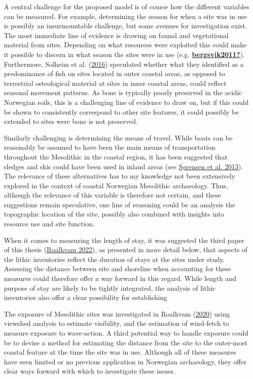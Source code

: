 \documentclass[
  a4paper,
  oneside]{uiophdthesis}
\begin{document}
A central challenge for the proposed model is of course how the different variables can be measured. For example, determining the season for when a site was in use is possibly an insurmountable challenge, but some avenues for investigation exist. The most immediate line of evidence is drawing on faunal and vegetational material from sites. Depending on what resources were exploited this could make it possible to discern in what season the sites were in use (e.g. \protect\hyperlink{ref-bergsvik2011}{\textbf{bergsvik2011?}}). Furthermore, Solheim et al. (\protect\hyperlink{ref-solheim2016}{2016}) speculated whether what they identified as a predominance of fish on sites located in outer coastal areas, as opposed to terrestrial osteological material at sites in inner coastal areas, could reflect seasonal movement patterns. As bone is typically poorly preserved in the acidic Norwegian soils, this is a challenging line of evidence to draw on, but if this could be shown to consistently correspond to other site features, it could possibly be extended to sites were bone is not preserved.

Similarly challenging is determining the means of travel. While boats can be reasonably be assumed to have been the main means of transportation throughout the Mesolithic in the coastal region, it has been suggested that sledges and skis could have been used in inland areas (see \protect\hyperlink{ref-suxf8rensen2013}{Sørensen et al. 2013}). The relevance of these alternatives has to my knowledge not been extensively explored in the context of coastal Norwegian Mesolithic archaeology. Thus, although the relevance of this variable is therefore not certain, and these suggestions remain speculative, one line of reasoning could be an analysis the topographic location of the site, possibly also combined with insights into resource use and site function.

When it comes to measuring the length of stay, it was suggested the third paper of this thesis (\protect\hyperlink{ref-roalkvam2022}{Roalkvam 2022}), as presented in more detail below, that aspects of the lithic inventories reflect the duration of stays at the sites under study. Assessing the distance between site and shoreline when accounting for these measures could therefore offer a way forward in this regard. While length and purpose of stay are likely to be tightly integrated, the analysis of lithic inventories also offer a clear possibility for establishing

The exposure of Mesolithic sites was investigated in Roalkvam (\protect\hyperlink{ref-roalkvam2020}{2020}) using viewshed analysis to estimate visibility, and the estimation of wind-fetch to measure exposure to wave-action. A third potential way to handle exposure could be to devise a method for estimating the distance from the site to the outer-most coastal feature at the time the site was in use. Although all of these measures have seen limited or no previous application in Norwegian archaeology, they offer clear ways forward with which to investigate these issues.
\end{document}
